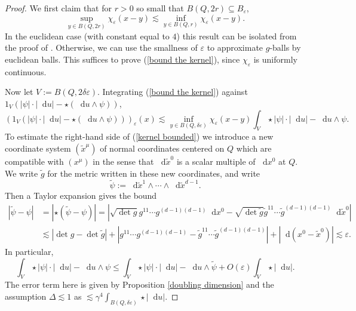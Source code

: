\documentclass[reqno,10pt]{amsart}
\newcommand*\dif{\mathop{}\!\mathrm{d}}
\theoremstyle{definition}
\numberwithin{equation}{section}
\begin{document}
\begin{proof}
We first claim that for $r > 0$ so small that $B(Q, 2r) \subseteq B_\varepsilon$,
\begin{equation}\label{bound the kernel}
\sup_{y \in B(Q, 2r)} \chi_\varepsilon(x - y) \lesssim \inf_{y \in B(Q, r)} \chi_\varepsilon(x - y).
\end{equation}
In the euclidean case (with constant equal to $4$) this result can be isolated from the proof of \cite[Theorem 7.3]{Giusti77}.
Otherwise, we can use the smallness of $\varepsilon$ to approximate $g$-balls by euclidean balls.
This suffices to prove (\ref{bound the kernel}), since $\chi_\varepsilon$ is uniformly continuous.

Now let $V := B(Q, 2\delta\varepsilon)$.
Integrating (\ref{bound the kernel}) against $1_V(|\psi| \cdot |\dif u| - \star(\dif u \wedge \psi))$,
\begin{equation}\label{kernel bounded}
(1_V(|\psi| \cdot |\dif u| - \star(\dif u \wedge \psi)))_\varepsilon(x) \lesssim \inf_{y \in B(Q, \delta\varepsilon)} \chi_\varepsilon(x - y) \int_V \star |\psi| \cdot |\dif u| - \dif u \wedge \psi.
\end{equation}
To estimate the right-hand side of (\ref{kernel bounded}) we introduce a new coordinate system $(\tilde x^\mu)$ of normal coordinates centered on $Q$ which are compatible with $(x^\mu)$ in the sense that $\dif \tilde x^0$ is a scalar multiple of $\dif x^0$ at $Q$.
We write $\tilde g$ for the metric written in these new coordinates, and write
$$\tilde \psi := \dif \tilde x^1 \wedge \cdots \wedge \dif \tilde x^{d - 1}.$$
Then a Taylor expansion gives the bound
\begin{align}
|\tilde \psi - \psi| &= |\star(\tilde \psi - \psi)| = |\sqrt{\det g} g^{11} \cdots g^{(d-1)(d-1)} \dif x^0 - \sqrt{\det \tilde g} \tilde g^{11} \cdots \tilde g^{(d-1)(d-1)} \dif \tilde x^0|\\
&\lesssim |\det g - \det \tilde g| + |g^{11} \cdots g^{(d-1)(d-1)} - \tilde g^{11} \cdots \tilde g^{(d-1)(d-1)}| + |\dif(x^0 - \tilde x^0)| \lesssim \varepsilon. \label{T vs Ttilde}
\end{align}
In particular,
\begin{equation}\label{split up T Ttilde}
\int_V \star |\psi| \cdot |\dif u| - \dif u \wedge \psi \leq \int_V \star |\psi| \cdot |\dif u| - \dif u \wedge \tilde \psi + O(\varepsilon) \int_V \star |\dif u|.
\end{equation}
The error term here is given by Proposition \ref{doubling dimension} and the assumption $\Delta \lesssim 1$ as $\lesssim \gamma^4 \int_{B(Q, \delta\varepsilon)} \star |\dif u|$.

\end{proof}
\end{document}
